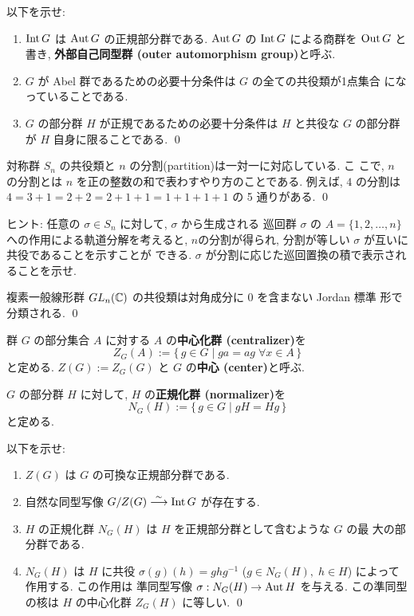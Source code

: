 \documentclass[12pt,twoside]{jarticle}
\def\Sym{S}
\def\Aut{\mathop{\text{\rm Aut}}\nolimits}
\def\Int{\mathop{\text{\rm Int}}\nolimits}
\def\Out{\mathop{\text{\rm Out}}\nolimits}
\def\Int{\mathop{\text{\rm Int}}\nolimits}
\def\C{{\Bbb C}} %
\def\isoto{\overset\sim\longrightarrow}
\begin{document}
\begin{question}
  以下を示せ:
  \begin{enumerate}
  \item $\Int G$ は $\Aut G$ の正規部分群である. 
    $\Aut G$ の $\Int G$ による商群を $\Out G$ と書き, 
    {\bf 外部自己同型群 (outer automorphism group)}と呼ぶ.
  \item $G$ が Abel 群であるための必要十分条件は $G$ の全ての共役類が1点集合
    になっていることである.
  \item $G$ の部分群 $H$ が正規であるための必要十分条件は $H$ と共役な $G$ %
    の部分群が $H$ 自身に限ることである.
  \qed
  \end{enumerate}
\end{question}

\begin{question}
  対称群 $\Sym_n$ の共役類と $n$ の分割(partition)は一対一に対応している. こ
  こで, $n$ の分割とは $n$ を正の整数の和で表わすやり方のことである. 例えば, 
  $4$ の分割は $4=3+1=2+2=2+1+1=1+1+1+1$ の 5 通りがある.
  \qed
\end{question}

\noindent ヒント: 任意の $\sigma\in\Sym_n$ に対して, $\sigma$ から生成される
巡回群 $\sigma$ の $A=\{1,2,\dots,n\}$ への作用による軌道分解を考えると, %
$n$の分割が得られ, 分割が等しい $\sigma$ が互いに共役であることを示すことが
できる. $\sigma$ が分割に応じた巡回置換の積で表示されることを示せ.

\begin{question}
  複素一般線形群 $GL_n(\C)$ の共役類は対角成分に $0$ を含まない Jordan 標準
  形で分類される. \qed
\end{question}

群 $G$ の部分集合 $A$ に対する $A$ の{\bf 中心化群 (centralizer)}を %
\begin{equation*}
  Z_G(A) := \{\, g\in G\mid ga=ag\;\forall x\in A\,\}
\end{equation*}
と定める. $Z(G) := Z_G(G)$ と $G$ の{\bf 中心 (center)}と呼ぶ.

$G$ の部分群 $H$ に対して, $H$ の{\bf 正規化群 (normalizer)}を %
\begin{equation*}
  N_G(H) := \{\, g\in G\mid gH = Hg \,\}
\end{equation*}
と定める.

\begin{question}
  以下を示せ:
  \begin{enumerate}
  \item $Z(G)$ は $G$ の可換な正規部分群である. 
  \item 自然な同型写像 $G/Z(G)\isoto\Int G$ が存在する.
  \item $H$ の正規化群 $N_G(H)$ は $H$ を正規部分群として含むような $G$ の最
    大の部分群である. 
  \item $N_G(H)$ は $H$ に共役 $\sigma(g)(h)=ghg^{-1}$ 
    ($g\in N_G(H),\; h\in H$) によって作用する. この作用は
    準同型写像 $\sigma:N_G(H)\to\Aut H$ を与える.
    この準同型の核は $H$ の中心化群 $Z_G(H)$ に等しい.
    \qed
  \end{enumerate}
\end{question}
\end{document}

